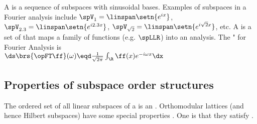 \begin{example}
A  is a sequence of subspaces with sinusoidal bases.
  Examples of subspaces in a Fourier analysis include $\spV_1=\linspan\setn{e^{ix}}$, 
  $\spV_{2.3}=\linspan\setn{e^{i2.3x}}$, $\spV_{\sqrt{2}}=\linspan\setn{e^{i\sqrt{2}x}}$, etc.
  A  is a set of  that maps a family of functions (e.g. $\spLLR$)
  into an analysis.
  The " for Fourier Analysis is 
  \\\indentx$\ds\brs{\opFT\ff}(\omega) \eqd \frac{1}{\sqrt{2\pi}} \int_\R \ff(x) e^{-i\omega x} \dx$
\end{example}



\subsection{Properties of subspace order structures}
The ordered set of all linear subspaces of a  is an .
Orthomodular lattices (and hence Hilbert subspaces) have some special properties .
One is that they satisfy .

